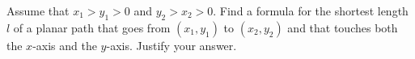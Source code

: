 Assume that $x_1 > y_1 > 0$ and $y_2 > x_2 > 0$. Find a formula for the
shortest length $l$ of a planar path that goes from $(x_1, y_1)$ to $(x_2,
y_2)$ and that touches both the $x$-axis and the $y$-axis. Justify your answer.
